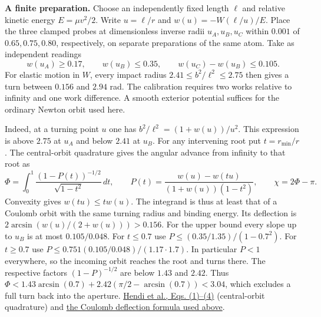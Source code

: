 \documentclass[11pt,a4paper]{article}
\begin{document}
\textbf{A finite preparation.} Choose an independently fixed length
\(\ell\) and relative kinetic energy \(E=\mu v^2/2\). Write \(u=\ell/r\)
and \(w(u)=-W(\ell/u)/E\). Place the three clamped probes at
dimensionless inverse radii \(u_A,u_B,u_C\) within \(0.001\) of
\(0.65,0.75,0.80\), respectively, on separate preparations of the same
atom. Take as independent readings \[
 w(u_A)\ge0.17,\qquad w(u_B)\le0.35,\qquad
 w(u_C)-w(u_B)\le0.105 .
\] For elastic motion in \(W\), every impact radius
\(2.41\le b^2/\ell^2\le2.75\) then gives a turn between \(0.156\) and
\(2.94\) rad. The calibration requires two works relative to infinity
and one work difference. A smooth exterior potential suffices for the
ordinary Newton orbit used here.

Indeed, at a turning point \(u\) one has \(b^2/\ell^2=(1+w(u))/u^2\).
This expression is above \(2.75\) at \(u_A\) and below \(2.41\) at
\(u_B\). For any intervening root put \(t=r_{\min}/r\). The
central-orbit quadrature gives the angular advance from infinity to that
root as \[
 \Phi=\int_0^1\frac{(1-P(t))^{-1/2}}{\sqrt{1-t^2}}\,dt,\qquad
 P(t)=\frac{w(u)-w(tu)}{(1+w(u))(1-t^2)},\qquad \chi=2\Phi-\pi .
\] Convexity gives \(w(tu)\le t w(u)\). The integrand is thus at least
that of a Coulomb orbit with the same turning radius and binding energy.
Its deflection is \(2\arcsin(w(u)/(2+w(u)))>0.156\). For the upper bound
every slope up to \(u_B\) is at most \(0.105/0.048\). For \(t\le0.7\)
use \(P\le(0.35/1.35)/(1-0.7^2)\). For \(t\ge0.7\) use
\(P\le0.751(0.105/0.048)/(1.17\cdot1.7)\). In particular \(P<1\)
everywhere, so the incoming orbit reaches the root and turns there. The
respective factors \((1-P)^{-1/2}\) are below \(1.43\) and \(2.42\).
Thus \(\Phi<1.43\arcsin(0.7)+2.42(\pi/2-\arcsin(0.7))<3.04\), which
excludes a full turn back into the aperture.
\href{https://arxiv.org/pdf/cond-mat/0605637}{Hendi et al., Eqs.
(1)--(4)} (central-orbit quadrature) and
\hyperref[a-three-energy-test-of-central-force-trajectories]{the Coulomb
deflection formula used above}.
\end{document}
